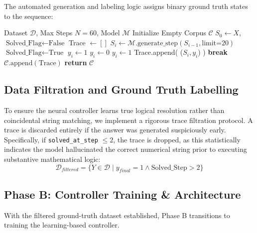 \documentclass[11pt]{article}
\begin{document}
The automated generation and labeling logic assigns binary ground truth states to the sequence:
\begin{algorithm}[H]
\caption{Phase A: Automated Trace Generation}
\label{alg:trace_gen}
\begin{algorithmic}[1]
\REQUIRE Dataset $\mathcal{D}$, Max Steps $N=60$, Model $\mathcal{M}$
\STATE Initialize Empty Corpus $\mathcal{C}$
    \STATE $S_0 \leftarrow X$, $\text{Solved\_Flag} \leftarrow \text{False}$
    \STATE Trace $\leftarrow []$
        \STATE $S_i \leftarrow \mathcal{M}.\text{generate\_step}(S_{i-1}, \text{limit=20})$
                \STATE $\text{Solved\_Flag} \leftarrow \text{True}$
                \STATE $y_i \leftarrow 1$
            \ELSE
                \STATE $y_i \leftarrow 0$
            \ENDIF
        \ELSE
            \STATE $y_i \leftarrow 1$
        \ENDIF
        \STATE Trace.append( ($S_i, y_i$) )
            \STATE \textbf{break}
        \ENDIF
    \ENDFOR
        \STATE $\mathcal{C}.\text{append}(\text{Trace})$
    \ENDIF
\ENDFOR
\STATE \textbf{return} $\mathcal{C}$
\end{algorithmic}
\end{algorithm}

\subsection{Data Filtration and Ground Truth Labelling}
To ensure the neural controller learns true logical resolution rather than coincidental string matching, we implement a rigorous trace filtration protocol. A trace is discarded entirely if the answer was generated suspiciously early. Specifically, if \texttt{solved\_at\_step} $\le 2$, the trace is dropped, as this statistically indicates the model hallucinated the correct numerical string prior to executing substantive mathematical logic:
\begin{equation}
    \mathcal{D}_{filtered} = \{ Y \in \mathcal{D} \mid y_{final} = 1 \land \text{Solved\_Step} > 2 \}
\end{equation}

\subsection{Phase B: Controller Training \& Architecture}
With the filtered ground-truth dataset established, Phase B transitions to training the learning-based controller.
\end{document}
